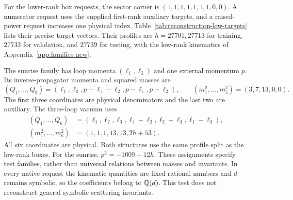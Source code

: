 For the lower-rank box requests, the sector corner is $(1,1,1,1,1,1,1,0,0)$. A numerator request uses the supplied first-rank auxiliary targets, and a raised-power request increases one physical index. Table~\ref{tab:reconstruction-low-targets} lists their precise target vectors. Their profiles are $h=27701,27713$ for training, $27733$ for validation, and $27739$ for testing, with the low-rank kinematics of Appendix~\ref{app:families-new}.

The sunrise family has loop momenta $(\ell_1,\ell_2)$ and one external momentum $p$. Its inverse-propagator momenta and squared masses are
\begin{equation}
 (Q_1,\ldots,Q_5)=(\ell_1,\ell_2,p-\ell_1-\ell_2,p-\ell_1,p-\ell_2),
 \qquad (m_1^2,\ldots,m_5^2)=(3,7,13,0,0).
 \label{eq:reconstruction-sunrise}
\end{equation}
The first three coordinates are physical denominators and the last two are auxiliary. The three-loop vacuum uses
\begin{align}
 (Q_1,\ldots,Q_6)&=(\ell_1,\ell_2,\ell_3,\ell_1-\ell_2,\ell_2-\ell_3,\ell_1-\ell_3),\nonumber\\
 (m_1^2,\ldots,m_6^2)&=(1,1,1,13,13,2h+53).
 \label{eq:reconstruction-vacuum}
\end{align}
All six coordinates are physical. Both structures use the same profile split as the low-rank boxes. For the sunrise, $p^2=-1009-12h$. These assignments specify test families, rather than universal relations between masses and invariants. In every native request the kinematic quantities are fixed rational numbers and $d$ remains symbolic, so the coefficients belong to $\mathbb Q(d)$. This test does not reconstruct general symbolic scattering invariants.

